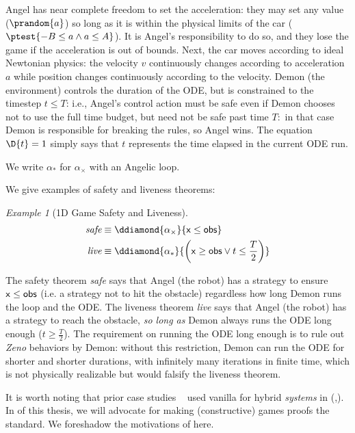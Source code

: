 \documentclass[12pt]{cmuthesis}
\theoremstyle{definition}
\theoremstyle{remark}
\newtheorem{example}{Example}
\newcommand{\obsvar}{{\sf obs}\xspace}
\newcommand{\xvar}{{\sf x}\xspace}
\newcommand{\rref}[2][]{\prettyref{#2}}
\begin{document}
Angel has near complete freedom to set the acceleration: they may set any value ($\prandom{a}$) so long as it is within the physical limits of the car ($\ptest{-B \leq a \land a \leq A}$).
It is Angel's responsibility to do so, and they lose the game if the acceleration is out of bounds.
Next, the car moves according to ideal Newtonian physics: the velocity $v$ continuously changes according to acceleration $a$ while position changes continuously according to the velocity.
Demon (the environment) controls the duration of the ODE, but is constrained to the timestep $t \leq T$: i.e., Angel's control action must be safe even if Demon chooses not to use the full time budget, but need not be safe past time $T:$ in that case Demon is responsible for breaking the rules, so Angel wins.
The equation $\D{t}=1$ simply says that $t$ represents the time elapsed in the current ODE run.

We write $\alpha_*$ for $\alpha_\times$ with an Angelic loop.

We give examples of safety and liveness theorems:
\begin{example}[1D Game Safety and Liveness]
  \begin{align*}
    \textit{safe} &\equiv \ddiamond{\alpha_\times}{\xvar \leq \obsvar}\\
    \textit{live} &\equiv \ddiamond{\alpha_*}{\left(\xvar \geq \obsvar \lor t \leq \frac{T}{2}\right)}
  \end{align*}
\end{example}
The safety theorem \emph{safe} says that Angel (the robot) has a strategy to ensure $\xvar \leq \obsvar$ (i.e. a strategy not to hit the obstacle) regardless how long Demon runs the loop and the ODE.
The liveness theorem \emph{live} says that Angel (the robot) has a strategy to reach the obstacle, \emph{so long as} Demon always runs the ODE long enough ($t \geq \frac{T}{2}$).
The requirement on running the ODE long enough is to rule out \emph{Zeno} behaviors by Demon: without this restriction, Demon can run the ODE for shorter and shorter durations, with infinitely many iterations in finite time, which is not physically realizable but would falsify the liveness theorem.

It is worth noting that prior case studies ~\cite{DBLP:conf/emsoft/JeanninGKGSZP15,DBLP:conf/fm/LoosPN11,DBLP:conf/rss/MitschGP13,DBLP:conf/hybrid/PlatzerQ08} used vanilla \dL for hybrid \emph{systems} in \KeYmaeraX (\rref{sec:veriphy},\rref{sec:ground-robotics}).
In \rref{ch:cdgl} of this thesis, we will advocate for making (constructive) games proofs the standard.
We foreshadow the motivations of \rref{ch:cdgl} here.
\end{document}
